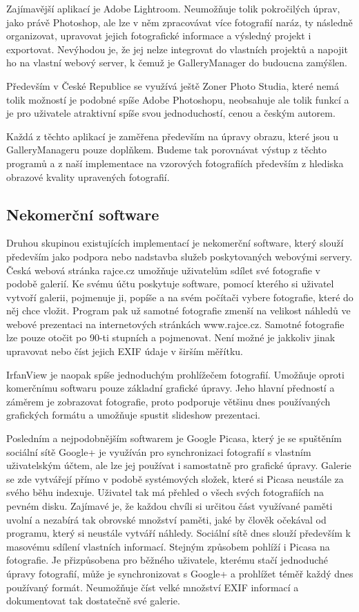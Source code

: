 \documentclass[11pt,twoside,a4paper]{book}
\begin{document}
\indent
Zajímavější aplikací je Adobe Lightroom. Neumožňuje tolik pokročilých úprav, jako právě Photoshop, ale lze v něm zpracovávat více fotografií naráz, ty následně organizovat, upravovat jejich fotografické informace a výsledný projekt i exportovat. Nevýhodou je, že jej nelze integrovat do vlastních projektů a napojit ho na vlastní webový server, k čemuž je GalleryManager do budoucna zamýšlen.

\indent
Především v České Republice se využívá ještě Zoner Photo Studia, které nemá tolik možností je podobné spíše Adobe Photoshopu, neobsahuje ale tolik funkcí a je pro uživatele atraktivní spíše svou jednoduchostí, cenou a českým autorem.

\indent
Každá z těchto aplikací je zaměřena především na úpravy obrazu, které jsou u GalleryManageru pouze doplňkem. Budeme tak porovnávat výstup z těchto programů a z naší implementace na vzorových fotografiích především z hlediska obrazové kvality upravených fotografií.

\subsection{Nekomerční software}
\noindent
Druhou skupinou existujících implementací je nekomerční software, který slouží především jako podpora nebo nadstavba služeb poskytovaných webovými servery. Česká webová stránka rajce.cz umožňuje uživatelům sdílet své fotografie v podobě galerií. Ke svému účtu poskytuje software, pomocí kterého si uživatel vytvoří galerii, pojmenuje ji, popíše a na svém počítači vybere fotografie, které do něj chce vložit. Program pak už samotné fotografie zmenší na velikost náhledů ve webové prezentaci na internetových stránkách www.rajce.cz. Samotné fotografie lze pouze otočit po 90-ti stupních a pojmenovat. Není možné je jakkoliv jinak upravovat nebo číst jejich EXIF údaje v širším měřítku.

\indent
IrfanView je naopak spíše jednoduchým prohlížečem fotografií. Umožňuje oproti komerčnímu softwaru pouze základní grafické úpravy. Jeho hlavní předností a záměrem je zobrazovat fotografie, proto podporuje většinu dnes používaných grafických formátu a umožňuje spustit slideshow prezentaci.

\indent
Posledním a nejpodobnějším softwarem je Google Picasa, který je se spuštěním sociální sítě Google+ je využíván pro synchronizaci fotografií s vlastním uživatelským účtem, ale lze jej používat i samostatně pro grafické úpravy. Galerie se zde vytvářejí přímo v podobě systémových složek, které si Picasa neustále za svého běhu indexuje. Uživatel tak má přehled o všech svých fotografiích na pevném disku. Zajímavé je, že každou chvíli si určitou část využívané paměti uvolní a nezabírá tak obrovské množství paměti, jaké by člověk očekával od programu, který si neustále vytváří náhledy.
\indent
Sociální sítě dnes slouží především k masovému sdílení vlastních informací. Stejným způsobem pohlíží i Picasa na fotografie. Je přizpůsobena pro běžného uživatele, kterému stačí jednoduché úpravy fotografií, může je synchronizovat s Google+ a prohlížet téměř každý dnes používaný formát. Neumožňuje číst velké množství EXIF informací a dokumentovat tak dostatečně své galerie.
\end{document}
